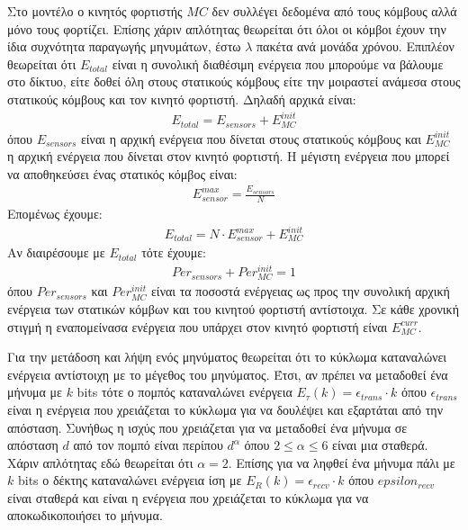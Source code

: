 Στο μοντέλο ο κινητός φορτιστής $MC$ δεν συλλέγει δεδομένα από τους κόμβους αλλά μόνο τους φορτίζει. Επίσης χάριν απλότητας θεωρείται ότι όλοι οι
κόμβοι έχουν την ίδια συχνότητα παραγωγής μηνυμάτων, έστω $\lambda$ πακέτα ανά μονάδα χρόνου. Επιπλέον θεωρείται ότι $E_{total}$ είναι η συνολική διαθέσιμη ενέργεια
που μπορούμε να βάλουμε στο δίκτυο, είτε δοθεί όλη στους στατικούς κόμβους είτε την μοιραστεί ανάμεσα στους στατικούς κόμβους και τον κινητό φορτιστή. Δηλαδή
αρχικά είναι:
\begin{align}
\label{total}
E_{total} = E_{sensors} + E_{MC}^{init}
\end{align}
όπου $E_{sensors}$ είναι η αρχική ενέργεια που δίνεται στους στατικούς κόμβους και $E_{MC}^{init}$ η αρχική ενέργεια που δίνεται στον κινητό φορτιστή. Η μέγιστη
ενέργεια που μπορεί να αποθηκεύσει ένας στατικός κόμβος είναι:
\begin{align*}
E^{max}_{sensor} = \frac{E_{sensors}}{N}
\end{align*}
Επομένως έχουμε:
\begin{align*}
E_{total} = N \cdot E^{max}_{sensor} + E_{MC}^{init}
\end{align*}
Αν διαιρέσουμε με $E_{total}$ τότε έχουμε:
\begin{align*}
Per_{sensors} + Per_{MC}^{init} = 1
\end{align*}
όπου $Per_{sensors}$ και $Per_{MC}^{init}$ είναι τα ποσοστά ενέργειας ως προς την συνολική αρχική ενέργεια των στατικών κόμβων και του κινητού φορτιστή αντίστοιχα.
Σε κάθε χρονική στιγμή η εναπομείνασα ενέργεια που υπάρχει στον κινητό φορτιστή είναι $E^{curr}_{MC}$.

Για την μετάδοση και λήψη ενός μηνύματος θεωρείται ότι το κύκλωμα καταναλώνει ενέργεια αντίστοιχη με το μέγεθος του μηνύματος. Έτσι, αν πρέπει να μεταδοθεί ένα
μήνυμα με $k$ bits τότε ο πομπός καταναλώνει ενέργεια $E_{\tau}(k) = \epsilon_{trans}\cdot k$ όπου $\epsilon_{trans}$ είναι η ενέργεια που
χρειάζεται το κύκλωμα για να δουλέψει και εξαρτάται από την απόσταση. Συνήθως η ισχύς που χρειάζεται για να μεταδοθεί ένα μήνυμα σε απόσταση $d$ από τον πομπό είναι
περίπου $d^{\alpha}$ όπου $2\leq\alpha\leq6$ είναι μια σταθερά. Χάριν απλότητας εδώ θεωρείται ότι $\alpha = 2$. Επίσης για να ληφθεί ένα μήνυμα πάλι με $k$ bits ο
δέκτης καταναλώνει ενέργεια ίση με $E_{R}(k) = \epsilon_{recv}\cdot k$ όπου $epsilon_{recv}$ είναι σταθερά και είναι η ενέργεια που χρειάζεται το κύκλωμα για να
αποκωδικοποιήσει το μήνυμα.


